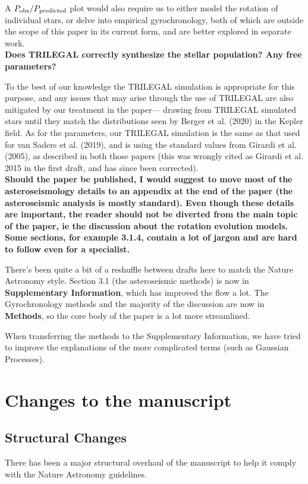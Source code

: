 \documentclass[11pt]{article}
\begin{document}
A $P_{\rm obs}/P_{\rm predicted}$  plot would also require us to either model the rotation of individual stars, or delve into empirical gyrochronology, both of which are outside the scope of this paper in its current form, and are better explored in separate work.\\

\noindent\textbf{ Does TRILEGAL correctly synthesize the stellar population? Any free parameters?}

To the best of our knowledge the TRILEGAL simulation is appropriate for this purpose, and any issues that may arise through the use of TRILEGAL are also mitigated by our treatment in the paper--- drawing from TRILEGAL simulated stars until they match the distributions seen by Berger et al. (2020) in the Kepler field. As for the parameters, our TRILEGAL simulation is the same as that used for van Saders et al. (2019), and is using the standard values from Girardi et al. (2005), as described in both those papers (this was wrongly cited as Girardi et al. 2015 in the first draft, and has since been corrected). \\

\noindent\textbf{ Should the paper be published, I would suggest to move most of the asteroseismology details to an appendix at the end of the paper (the asteroseismic analysis is mostly standard). Even though these details are important, the reader should not be diverted from the main topic of the paper, ie the discussion about the rotation evolution models.
Some sections, for example 3.1.4, contain a lot of jargon and are hard to follow even for a specialist. }

There’s been quite a bit of a reshuffle between drafts here to match the Nature Astronomy style. Section 3.1 (the asteroseismic methods) is now in \textbf{Supplementary Information}, which has improved the flow a lot. The Gyrochronology methods and the majority of the discussion are now in \textbf{Methods}, so the core body of the paper is a lot more streamlined.

When transferring the methods to the Supplementary Information, we have tried to improve the explanations of the more complicated terms (such as Gaussian Processes).

\clearpage
\section*{Changes to the manuscript}
\subsection*{Structural Changes}
There has been a major structural overhaul of the manuscript to help it comply with the Nature Astronomy guidelines.
\end{document}
